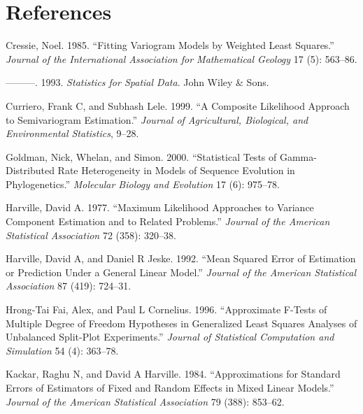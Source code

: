 \documentclass{article}
\begin{document}
\hypertarget{references}{%
\section*{References}\label{references}}

\hypertarget{refs}{}
\leavevmode\hypertarget{ref-cressie1985fitting}{}%
Cressie, Noel. 1985. ``Fitting Variogram Models by Weighted Least
Squares.'' \emph{Journal of the International Association for
Mathematical Geology} 17 (5): 563--86.

\leavevmode\hypertarget{ref-cressie1993statistics}{}%
---------. 1993. \emph{Statistics for Spatial Data}. John Wiley \& Sons.

\leavevmode\hypertarget{ref-curriero1999composite}{}%
Curriero, Frank C, and Subhash Lele. 1999. ``A Composite Likelihood
Approach to Semivariogram Estimation.'' \emph{Journal of Agricultural,
Biological, and Environmental Statistics}, 9--28.

\leavevmode\hypertarget{ref-goldman2000statistical}{}%
Goldman, Nick, Whelan, and Simon. 2000. ``Statistical Tests of
Gamma-Distributed Rate Heterogeneity in Models of Sequence Evolution in
Phylogenetics.'' \emph{Molecular Biology and Evolution} 17 (6): 975--78.

\leavevmode\hypertarget{ref-harville1977maximum}{}%
Harville, David A. 1977. ``Maximum Likelihood Approaches to Variance
Component Estimation and to Related Problems.'' \emph{Journal of the
American Statistical Association} 72 (358): 320--38.

\leavevmode\hypertarget{ref-harville1992mean}{}%
Harville, David A, and Daniel R Jeske. 1992. ``Mean Squared Error of
Estimation or Prediction Under a General Linear Model.'' \emph{Journal
of the American Statistical Association} 87 (419): 724--31.

\leavevmode\hypertarget{ref-hrong1996approximate}{}%
Hrong-Tai Fai, Alex, and Paul L Cornelius. 1996. ``Approximate F-Tests
of Multiple Degree of Freedom Hypotheses in Generalized Least Squares
Analyses of Unbalanced Split-Plot Experiments.'' \emph{Journal of
Statistical Computation and Simulation} 54 (4): 363--78.

\leavevmode\hypertarget{ref-kackar1984approximations}{}%
Kackar, Raghu N, and David A Harville. 1984. ``Approximations for
Standard Errors of Estimators of Fixed and Random Effects in Mixed
Linear Models.'' \emph{Journal of the American Statistical Association}
79 (388): 853--62.
\end{document}
